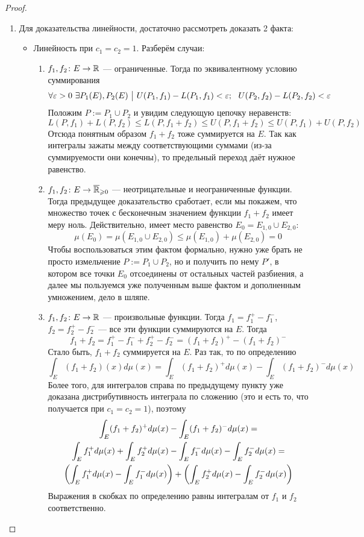 \begin{proof}~
	\begin{enumerate}
		\item Для доказательства линейности, достаточно рассмотреть доказать 2 факта:
		\begin{itemize}
			\item Линейность при $c_1 = c_2 = 1$. Разберём случаи:
			\begin{enumerate}
				\item $f_1, f_2 \colon E \to \mathbb{R}$ --- ограниченные. Тогда по эквивалентному условию суммирования
				\[
					\forall \varepsilon > 0\ \exists P_1(E), P_2(E) \ \big|\  U(P_1, f_1) - L(P_1, f_1) < \varepsilon;\ \ U(P_2, f_2) - L(P_2, f_2) < \varepsilon
				\]
				Положим $P := P_1 \cup P_2$ и увидим следующую цепочку неравенств:
				\[
					L(P, f_1) + L(P, f_2) \le L(P, f_1 + f_2) \le U(P, f_1 + f_2) \le U(P, f_1) + U(P, f_2)
				\]
				Отсюда понятным образом $f_1 + f_2$ тоже суммируется на $E$. Так как интегралы зажаты между соответствующими суммами (из-за суммируемости они конечны), то предельный переход даёт нужное равенство.
				
				\item $f_1, f_2 \colon E \to \overline{\mathbb{R}}_{\geqslant 0}$ --- неотрицательные и неограниченные функции. Тогда предыдущее доказательство сработает, если мы покажем, что множество точек с бесконечным значением функции $f_1 + f_2$ имеет меру ноль. Действительно, имеет место равенство $E_0 = E_{1, 0} \cup E_{2, 0}$:
				\[
					\mu(E_0) = \mu(E_{1, 0} \cup E_{2, 0}) \le \mu(E_{1, 0}) + \mu(E_{2, 0}) = 0
				\]
				Чтобы воспользоваться этим фактом формально, нужно уже брать не просто измельчение $P := P_1 \cup P_2$, но и получить по нему $P'$, в котором все точки $E_0$ отсоединены от остальных частей разбиения, а далее мы пользуемся уже полученным выше фактом и дополненным умножением, дело в шляпе.
				
				\item $f_1, f_2 \colon E \to \mathbb{R}$ --- произвольные функции. Тогда $f_1 = f_1^+ - f_1^-$, $f_2 = f_2^+ - f_2^-$ --- все эти функции суммируются на $E$. Тогда
				\[
					f_1 + f_2 = f_1^+ - f_1^- + f_2^+ - f_2^- = (f_1 + f_2)^+ - (f_1 + f_2)^-
				\]
				Стало быть, $f_1 + f_2$ суммируется на $E$. Раз так, то по определению
				\[
					\int_E (f_1 + f_2)(x)d\mu(x) = \int_E (f_1 + f_2)^+ d\mu(x) - \int_E (f_1 + f_2)^- d\mu(x)
				\]
				Более того, для интегралов справа по предыдущему пункту уже доказана дистрибутивность интеграла по сложению (это и есть то, что получается при $c_1 = c_2 = 1$), поэтому
				\begin{multline*}
					\int_E (f_1 + f_2)^+ d\mu(x) - \int_E (f_1 + f_2)^- d\mu(x) =
					\\
					\int_E f_1^+ d\mu(x) + \int_E f_2^+ d\mu(x) - \int_E f_1^- d\mu(x) - \int_E f_2^- d\mu(x) =
					\\
					\left(\int_E f_1^+ d\mu(x) - \int_E f_1^- d\mu(x)\right) + \left(\int_E f_2^+ d\mu(x) - \int_E f_2^- d\mu(x)\right)
				\end{multline*}
				Выражения в скобках по определению равны интегралам от $f_1$ и $f_2$ соответственно.
			\end{enumerate}
		

\end{itemize}
\end{enumerate}
\end{proof}
